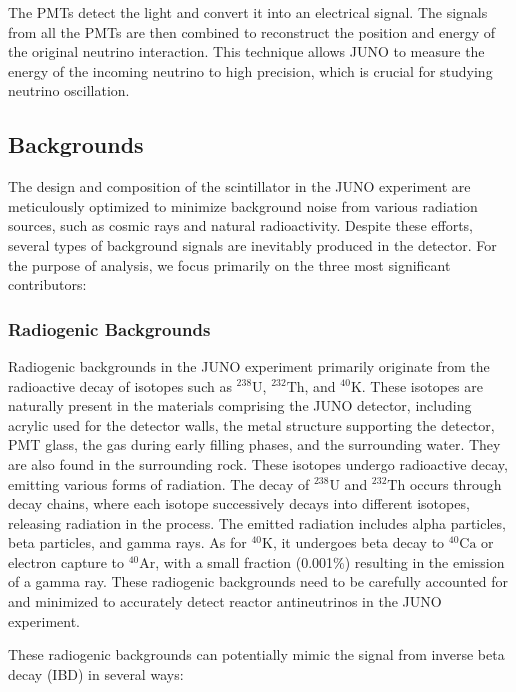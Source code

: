 The PMTs detect the light and convert it into an electrical signal. The signals from all the PMTs are then combined to reconstruct the position and energy of the original neutrino interaction. This technique allows JUNO to measure the energy of the incoming neutrino to high precision, which is crucial for studying neutrino oscillation.

\subsection{Backgrounds}
The design and composition of the scintillator in the JUNO experiment are meticulously optimized to minimize background noise from various radiation sources, such as cosmic rays and natural radioactivity. Despite these efforts, several types of background signals are inevitably produced in the detector. For the purpose of analysis, we focus primarily on the three most significant contributors:


\subsubsection*{Radiogenic Backgrounds}


Radiogenic backgrounds in the JUNO experiment primarily originate from the radioactive decay of isotopes such as $^{238}\mathrm{U}$, $^{232}\mathrm{Th}$, and $^{40}\mathrm{K}$. These isotopes are naturally present in the materials comprising the JUNO detector, including acrylic used for the detector walls, the metal structure supporting the detector, PMT glass, the gas during early filling phases, and the surrounding water. They are also found in the surrounding rock. These isotopes undergo radioactive decay, emitting various forms of radiation. The decay of $^{238}\mathrm{U}$ and $^{232}\mathrm{Th}$ occurs through decay chains, where each isotope successively decays into different isotopes, releasing radiation in the process. The emitted radiation includes alpha particles, beta particles, and gamma rays. As for $^{40}\mathrm{K}$, it undergoes beta decay to $^{40}\mathrm{Ca}$ or electron capture to $^{40}\mathrm{Ar}$, with a small fraction (0.001$\%$) resulting in the emission of a gamma ray. These radiogenic backgrounds need to be carefully accounted for and minimized to accurately detect reactor antineutrinos in the JUNO experiment.


These radiogenic backgrounds can potentially mimic the signal from inverse beta decay (IBD) in several ways:

